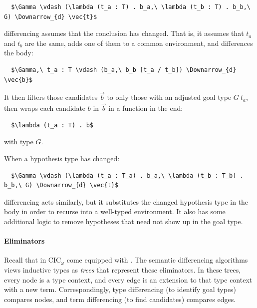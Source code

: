 \begin{lstlisting}
  $\Gamma \vdash (\lambda (t_a : T) . b_a,\ \lambda (t_b : T) . b_b,\ G) \Downarrow_{d} \vec{t}$
\end{lstlisting}
differencing assumes that the conclusion has changed.
That is, it assumes that $t_a$ and $t_b$ are the same, adds one of them to a common environment,
and differences the body:

\begin{lstlisting}
  $\Gamma,\ t_a : T \vdash (b_a,\ b_b [t_a / t_b]) \Downarrow_{d} \vec{b}$
\end{lstlisting}
It then filters those candidates $\vec{b}$ to only those with an adjusted goal type $G\ t_a$,
then wraps each candidate $b$ in $\vec{b}$ in a function in the end:

\begin{lstlisting}
  $\lambda (t_a : T) . b$
\end{lstlisting}
with type $G$.

When a hypothesis type has changed:

\begin{lstlisting}
  $\Gamma \vdash (\lambda (t_a : T_a) . b_a,\ \lambda (t_b : T_b) . b_b,\ G) \Downarrow_{d} \vec{t}$
\end{lstlisting}
differencing acts similarly, but it substitutes the changed hypothesis type in the body in order to recurse into a well-typed environment.
It also has some additional logic to remove hypotheses that need not show up in the goal type.

\paragraph{Eliminators} %
Recall that  in CIC$_{\omega}$ come equipped with .
The semantic differencing algorithms views inductive types as \emph{trees} that represent these eliminators.
In these trees, every node is a type context, and every edge is an extension to that type context 
with a new term. %
Correspondingly, type differencing (to identify goal types) compares nodes, 
and term differencing (to find candidates) compares edges. 

